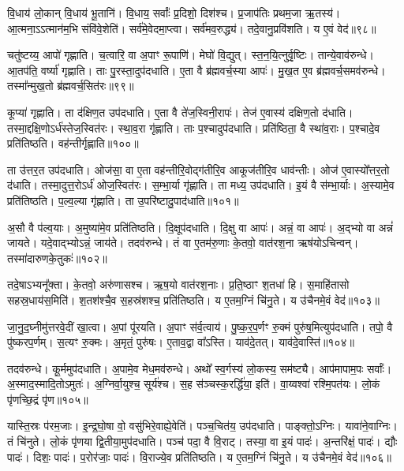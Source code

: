 वि॒धाय॑ लो॒कान्‌ वि॒धाय॑ भू॒तानि॑। वि॒धाय॒ सर्वाः᳚ प्र॒दिशो॒ दिश॑श्च। 
प्र॒जाप॑तिः प्रथम॒जा ऋ॒तस्य॑। आ॒त्मना॒ऽऽत्मान॑म॒भि संवि॑वे॒शेति॑। 
सर्व॑मे॒वेदमा॒प्त्वा। सर्व॑मव॒रुद्ध्य॑। 
तदे॒वानु॒प्रवि॑शति। य ए॒वं वेद॑॥९८॥\anuvakamend


चतु॑ष्टय्य॒ आपो॑ गृह्णाति। च॒त्वारि॒ वा अ॒पाꣳ रू॒पाणि॑। 
मेघो॑ वि॒द्युत्। स्त॒न॒यि॒त्नुर्वृ॒ष्टिः। तान्ये॒वाव॑रुन्धे। 
आ॒तप॑ति॒ वर्ष्या॑ गृह्णाति। ताः पु॒रस्ता॒दुप॑दधाति। 
ए॒ता वै ब्र॑ह्मवर्च॒स्या आपः॑। मु॒ख॒त ए॒व ब्र॑ह्मवर्च॒समव॑रुन्धे। 
तस्मा᳚न्मुख॒तो ब्र॑ह्मवर्च॒सित॑रः॥९९॥


कूप्या॑ गृह्णाति। ता द॑क्षिण॒त उप॑दधाति। 
ए॒ता वै ते॑ज॒स्विनी॒रापः॑। तेज॑ ए॒वास्य॑ दक्षिण॒तो द॑धाति। 
तस्मा॒द्दक्षि॒णो\-ऽर्ध॑स्तेज॒\-स्वित॑रः। स्था॒व॒रा गृ॑ह्णाति। 
ताः प॒श्चादुप॑दधाति। प्रति॑ष्ठिता॒ वै स्था॑व॒राः। 
प॒श्चादे॒व प्रति॑तिष्ठति। वह॑न्तीर्गृह्णाति॥१००॥


ता उ॑त्तर॒त उप॑दधाति। ओज॑सा॒ वा ए॒ता वह॑न्तीरि॒वोद्ग॑तीरि॒व आकूज॑तीरि॒व धाव॑न्तीः। 
ओज॑ ए॒वास्यो᳚त्तर॒तो द॑धाति। तस्मा॒दुत्त॒रोऽर्ध॑ ओज॒स्वित॑रः। 
स॒म्भा॒र्या गृ॑ह्णाति। ता मध्य॒ उप॑दधाति। 
इ॒यं वै स॑म्भा॒र्याः। अ॒स्यामे॒व प्रति॑तिष्ठति। 
प॒ल्व॒ल्या गृ॑ह्णाति। ता उ॒परि॑ष्टादु॒पाद॑धाति॥१०१॥


अ॒सौ वै प॑ल्व॒याः। अ॒मुष्या॑मे॒व प्रति॑तिष्ठति। 
दि॒क्षूप॑दधाति। दि॒क्षु वा आपः॑। 
अन्नं॒ वा आपः॑। अ॒द्भ्यो वा अन्नं॑ जायते। 
यदे॒वाद्भ्योऽन्नं॒ जाय॑ते। तदव॑रुन्धे। 
तं वा ए॒तम॑रु॒णाः के॒तवो॒ वात॑रश॒ना ऋष॑योऽचिन्वन्। 
तस्मा॑दारुणके॒तुकः॑॥१०२॥


तदे॒षाऽभ्यनू᳚क्ता। के॒तवो॒ अरु॑णासश्च। 
ऋ॒ष॒यो वात॑रश॒नाः। प्र॒ति॒ष्ठाꣳ श॒तधा॑ हि। 
स॒माहि॑तासो सहस्र॒धाय॑स॒मिति॑। श॒तश॑श्चै॒व स॒हस्र॑शश्च॒ प्रति॑तिष्ठति। 
य ए॒तम॒ग्निं चि॑नु॒ते। य उ॑चैनमे॒वं वेद॑॥१०३॥\anuvakamend


जा॒नु॒द॒घ्नीमु॑त्तरवे॒दीं खा॒त्वा। अ॒पां पू॑रयति। 
अ॒पाꣳ स॑र्व॒त्वाय॑। पु॒ष्क॒र॒प॒र्णꣳ रु॒क्मं पुरु॑ष॒मित्युप॑दधाति। 
तपो॒ वै पु॑ष्करप॒र्णम्। स॒त्यꣳ रु॒क्मः। 
अ॒मृतं॒ पुरु॑षः। ए॒ताव॒द्वा वा᳚ऽस्ति। 
याव॑दे॒तत्। याव॑दे॒वास्ति॑॥१०४॥


तदव॑रुन्धे। कू॒र्ममुप॑दधाति। 
अ॒पामे॒व मेध॒मव॑रुन्धे। अथो᳚ स्व॒र्गस्य॑ लो॒कस्य॒ सम॑ष्ट्यै। 
आप॑मापाम॒पः सर्वाः᳚। अ॒स्मा\-द॒स्मा\-दि॒तो\-ऽमुतः॑। 
अ॒ग्निर्वा॒युश्च॒ सूर्य॑श्च। स॒ह स॑ञ्चस्क॒रर्द्धि॑या॒ इति॑। 
वा॒य्वश्वा॑ रश्मि॒पत॑यः। लो॒कं पृ॑णच्छि॒द्रं पृ॑ण॥१०५॥


यास्ति॒स्रः प॑रम॒जाः। इ॒न्द्र॒घो॒षा वो॒ वसु॑भिरे॒वाह्ये॒वेति॑। 
पञ्च॒\-चित॑य॒ उप॑दधाति। पाङ्क्तो॒ऽग्निः। 
यावा॑ने॒वाग्निः। तं चि॑नुते। 
लो॒कं पृ॑णया द्वि॒तीया॒मुप॑\-दधाति। पञ्च॑ पदा॒ वै वि॒राट्। 
तस्या॒ वा इ॒यं पादः॑। अ॒न्तरि॑क्षं॒ पादः॑। द्यौः पादः॑। 
दिशः॒ पादः॑। प॒रोर॑जाः॒ पादः॑। वि॒राज्ये॒व प्रति॑तिष्ठति। 
य ए॒तम॒ग्निं चि॑नु॒ते। य उ॑चैनमे॒वं वेद॑॥१०६॥\anuvakamend


